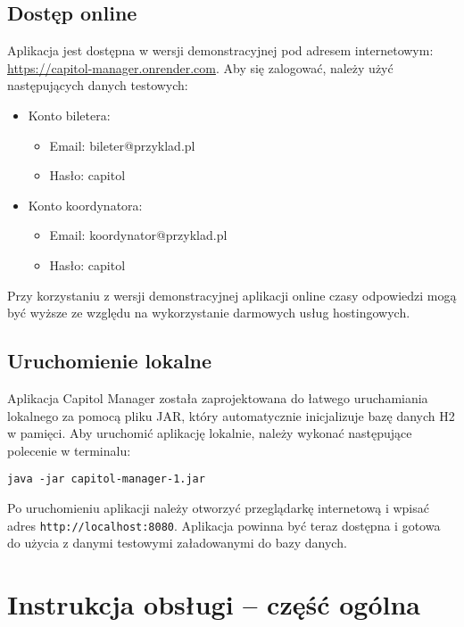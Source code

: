 \documentclass[shortabstract]{iithesis}
\begin{document}
\subsection{Dostęp online}

Aplikacja jest dostępna w wersji demonstracyjnej pod adresem internetowym: \url{https://capitol-manager.onrender.com}. Aby się zalogować, należy użyć następujących danych testowych:

\begin{itemize}
  \item Konto biletera:
  \begin{itemize}
    \item Email: bileter@przyklad.pl
    \item Hasło: capitol
  \end{itemize}
  \item Konto koordynatora:
  \begin{itemize}
    \item Email: koordynator@przyklad.pl
    \item Hasło: capitol
  \end{itemize}
\end{itemize}

Przy korzystaniu z wersji demonstracyjnej aplikacji online czasy odpowiedzi mogą być wyższe ze względu na wykorzystanie darmowych usług hostingowych.

\subsection{Uruchomienie lokalne}

Aplikacja Capitol Manager została zaprojektowana do łatwego uruchamiania lokalnego za pomocą pliku JAR, który automatycznie inicjalizuje bazę danych H2 w pamięci. Aby uruchomić aplikację lokalnie, należy wykonać następujące polecenie w terminalu:

\begin{verbatim}
java -jar capitol-manager-1.jar
\end{verbatim}

Po uruchomieniu aplikacji należy otworzyć przeglądarkę internetową i wpisać adres \texttt{http://localhost:8080}. Aplikacja powinna być teraz dostępna i gotowa do użycia z danymi testowymi załadowanymi do bazy danych.

\section{Instrukcja obsługi – część ogólna}
\end{document}
